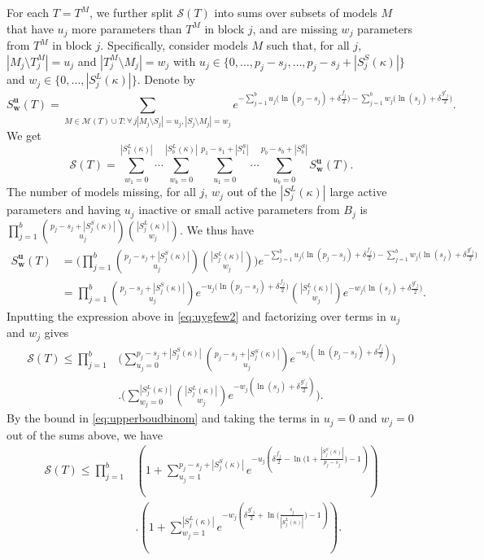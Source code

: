 \documentclass[
  12pt]{article}
\newcommand{\M}{\mathcal{M}}
\newcommand{\bu}{\mathbf{u}}
\newcommand{\bw}{\mathbf{w}}
\begin{document}
For each $T=T^M$, we further split $\mathcal{S}(T)$ into sums over subsets of models $M$ that have $u_j$ more parameters than $T^M$ in block $j$, and are missing $w_j$ parameters from $T^M$ in block $j$.
Specifically, consider models $M$ such that, for all $j$, $|M_j\setminus T^M_j|=u_j$ and $|T^M_j\setminus M_j|=w_j$ with $u_j \in \{0,\ldots,p_j-s_j,\ldots,p_j-s_j+|S_j^{S}(\kappa)|\}$ and $w_j \in \{0,\ldots,|S^{L}_j(\kappa)|\}$. Denote by
$$S^{\bu}_{\bw}(T)=\sum_{M \in \M(T) \cup T:\forall \,j |M_j\setminus S_j|=u_j, |S_j\setminus M_j|=w_j } e^{- \sum_{j=1}^b u_j\big(\ln(p_j-s_j)+\delta \tfrac{f_j}{2}\big)-\sum_{j=1}^b w_j\big(\ln(s_j)+\delta \tfrac{g'_j}{2}\big)}.$$
We get
\begin{equation}\label{eq:uygfew2}
    \mathcal{S}(T)=\sum_{w_1=0}^{|S^L_1(\kappa)|}\cdots\sum_{w_b=0}^{|S^L_b(\kappa)|}\sum_{u_1=0}^{p_1-s_1+|S_1^S|}\cdots\sum_{u_b=0}^{p_b-s_b+|S_b^S|}S^{\bu}_{\bw}(T).
\end{equation}
The number of models missing, for all $j$, $w_j$ out of the $|S^L_j(\kappa)|$ large active parameters and having $u_j$ inactive or small active parameters from $B_j$ is $\prod_{j=1}^b {\binom{p_j-s_j+|S^S_j(\kappa)|}{u_j}}{\binom{|S^L_j(\kappa)|}{w_j}}$. We thus have
\begin{align*}
    S^{\bu}_{\bw}(T)&= \bigg(\prod_{j=1}^b {\binom{p_j-s_j+|S^S_j(\kappa)|}{u_j}}{\binom{|S^L_j(\kappa)|}{w_j}}\bigg)e^{- \sum_{j=1}^b u_j\big(\ln(p_j-s_j)+\delta \tfrac{f_j}{2}\big)-\sum_{j=1}^b w_j\big(\ln(s_j)+\delta \tfrac{g'_j}{2}\big)} \\
    &= \prod_{j=1}^b {\binom{p_j-s_j+|S^S_j(\kappa)|}{u_j}}e^{- u_j\big(\ln(p_j-s_j)+\delta \tfrac{f_j}{2}\big)}{\binom{|S^L_j(\kappa)|}{w_j}}e^{-w_j\big(\ln(s_j)+\delta \tfrac{g'_j}{2}\big)}.
\end{align*}
Inputting the expression above in \eqref{eq:uygfew2} and factorizing over terms in $u_j$ and $w_j$ gives
\begin{align*}
    \mathcal{S}(T)\leq\prod_{j=1}^b & \Bigg(\sum_{u_j=0}^{p_j-s_j+|S^S_j(\kappa)|}{\binom{p_j-s_j+|S^S_j(\kappa)|}{u_j}}e^{- u_j(\ln(p_j-s_j)+\delta \tfrac{f_j}{2})}\Bigg)\\&.\Bigg(
    \sum_{w_j=0}^{|S^L_j(\kappa)|}{\binom{|S^L_j(\kappa)|}{w_j}}
    e^{-w_j(\ln(s_j)+\delta \tfrac{g'_j}{2})}\Bigg).
\end{align*}
By the bound in \eqref{eq:upperboudbinom} and taking the terms in $u_j=0$ and $w_j=0$ out of the sums above, %
we have
\begin{align}\label{eq:ogr}
    \mathcal{S}(T)\leq\prod_{j=1}^b & \left(1+\sum_{u_j=1}^{p_j-s_j+|S_j^{S}(\kappa)|}e^{-u_j\left(\delta \tfrac{f_j}{2}-\ln\big(1+\frac{|S^{S}_j(\kappa)|}{p_j-s_j}\big)-1\right)}\right)\\&.\left(1+
    \sum_{w_j=1}^{|S_j^{L}(\kappa)|}    e^{-w_j\left(\delta \tfrac{g'_j}{2}+\ln\big(\frac{s_j}{|S_j^{L}(\kappa)|}\big)-1\right)}\right).\nonumber
\end{align}
\end{document}
